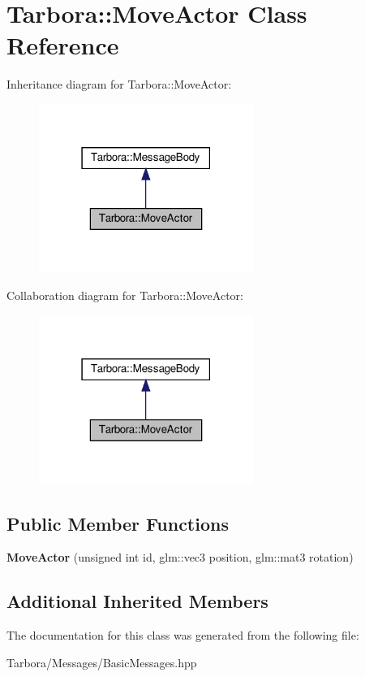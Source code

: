 \hypertarget{classTarbora_1_1MoveActor}{}\section{Tarbora\+:\+:Move\+Actor Class Reference}
\label{classTarbora_1_1MoveActor}


Inheritance diagram for Tarbora\+:\+:Move\+Actor\+:
\nopagebreak
\begin{figure}[H]
\begin{center}
\leavevmode
\includegraphics[width=198pt]{classTarbora_1_1MoveActor__inherit__graph}
\end{center}
\end{figure}


Collaboration diagram for Tarbora\+:\+:Move\+Actor\+:
\nopagebreak
\begin{figure}[H]
\begin{center}
\leavevmode
\includegraphics[width=198pt]{classTarbora_1_1MoveActor__coll__graph}
\end{center}
\end{figure}
\subsection*{Public Member Functions}
\begin{DoxyCompactItemize}
\item 
\mbox{\label{classTarbora_1_1MoveActor_a3bf64bd70be58bb0534d50355d4655d5}} 
{\bfseries Move\+Actor} (unsigned int id, glm\+::vec3 position, glm\+::mat3 rotation)
\end{DoxyCompactItemize}
\subsection*{Additional Inherited Members}


The documentation for this class was generated from the following file\+:\begin{DoxyCompactItemize}
\item 
Tarbora/\+Messages/Basic\+Messages.\+hpp\end{DoxyCompactItemize}

